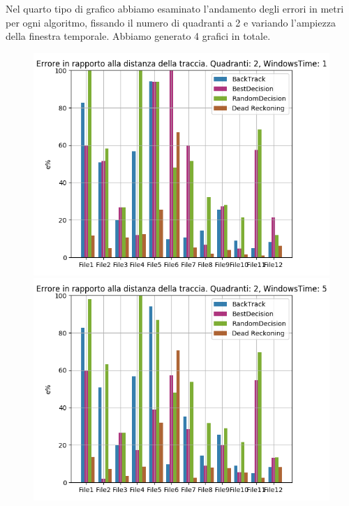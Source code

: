 \documentclass[12pt,a4paper,openright,twoside]{report}
\begin{document}
Nel quarto tipo di grafico abbiamo esaminato l'andamento degli errori in metri per ogni algoritmo, fissando il numero di quadranti a 2 e variando l'ampiezza della finestra temporale. Abbiamo generato 4 grafici in totale.

\begin{figure}[H]
\centering 
\includegraphics[scale=0.4]{firstChart2-1} 
\includegraphics[scale=0.4]{firstChart2-5} 
\end{figure}
\end{document}
